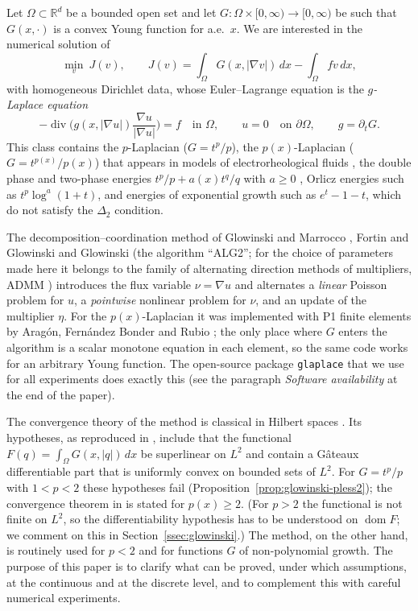 \documentclass[11pt]{amsart}
\theoremstyle{definition}
\theoremstyle{remark}
\numberwithin{equation}{section}
\newcommand{\R}{\mathbb{R}}
\newcommand{\dx}{\,dx}
\newcommand{\abs}[1]{\lvert #1\rvert}
\DeclareMathOperator{\dom}{dom}
\DeclareMathOperator{\divg}{div}
\begin{document}
Let $\Omega\subset\R^d$ be a bounded open set and let $G\colon\Omega\times[0,\infty)\to[0,\infty)$ be such that $G(x,\cdot)$ is a convex Young function for a.e.\ $x$. We are interested in the numerical solution of
\begin{equation}\label{eq:P}
\min_{v}\ J(v),\qquad J(v)=\int_\Omega G(x,\abs{\nabla v})\dx-\int_\Omega fv\dx,
\end{equation}
with homogeneous Dirichlet data, whose Euler--Lagrange equation is the \emph{$g$-Laplace equation}
\begin{equation}\label{eq:EL}
-\divg\Big(g(x,\abs{\nabla u})\frac{\nabla u}{\abs{\nabla u}}\Big)=f\quad\text{in }\Omega,\qquad u=0\quad\text{on }\partial\Omega,\qquad g=\partial_tG .
\end{equation}
This class contains the $p$-Laplacian ($G=t^p/p$), the $p(x)$-Laplacian ($G=t^{p(x)}/p(x)$) that appears in models of electrorheological fluids \cite{AcerbiMingione2002}, the double phase and two-phase energies $t^p/p+a(x)t^q/q$ with $a\ge0$ \cite{Zhikov1986,ColomboMingione2015a}, Orlicz energies such as $t^p\log^a(1+t)$, and energies of exponential growth such as $e^t-1-t$, which do not satisfy the $\Delta_2$ condition.

The decomposition--coordination method of Glowinski and Marrocco \cite{GlowinskiMarrocco1975}, Fortin and Glowinski \cite{FortinGlowinski1983,FortinGlowinski1983ChIII} and Glowinski \cite{Glowinski1984ChVI} (the algorithm ``ALG2''; for the choice of parameters made here it belongs to the family of alternating direction methods of multipliers, ADMM \cite{GlowinskiPanTai2016,Boyd2011ADMM}) introduces the flux variable $\nu=\nabla u$ and alternates a \emph{linear} Poisson problem for $u$, a \emph{pointwise} nonlinear problem for $\nu$, and an update of the multiplier $\eta$. For the $p(x)$-Laplacian it was implemented with P1 finite elements by Arag\'on, Fern\'andez Bonder and Rubio \cite{AragonFBRubio2023}; the only place where $G$ enters the algorithm is a scalar monotone equation in each element, so the same code works for an arbitrary Young function. The open-source package \texttt{glaplace} that we use for all experiments does exactly this (see the paragraph \emph{Software availability} at the end of the paper).

The convergence theory of the method is classical in Hilbert spaces \cite{Glowinski1984ChVI,FortinGlowinski1983,GlowinskiPanTai2016}. Its hypotheses, as reproduced in \cite{GlowinskiPanTai2016}, include that the functional $F(q)=\int_\Omega G(x,\abs q)\dx$ be superlinear on $L^2$ and contain a Gâteaux differentiable part that is uniformly convex on bounded sets of $L^2$. For $G=t^p/p$ with $1<p<2$ these hypotheses fail (Proposition~\ref{prop:glowinski-pless2}); the convergence theorem in \cite{AragonFBRubio2023} is stated for $p(x)\ge2$. (For $p>2$ the functional is not finite on $L^2$, so the differentiability hypothesis has to be understood on $\dom F$; we comment on this in Section~\ref{ssec:glowinski}.) The method, on the other hand, is routinely used for $p<2$ and for functions $G$ of non-polynomial growth. The purpose of this paper is to clarify what can be proved, under which assumptions, at the continuous and at the discrete level, and to complement this with careful numerical experiments.
\end{document}
